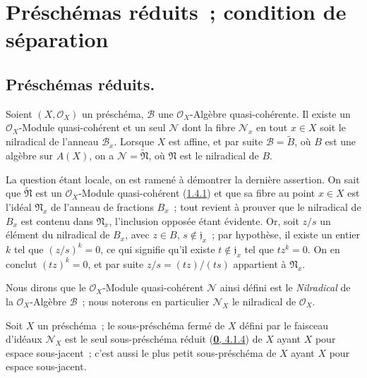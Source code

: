 \section{Préschémas réduits~; condition de séparation}
\label{section:I.5-fr}

\subsection{Préschémas réduits.}
\label{subsection:I.5.1-fr}

\begin{proposition}[5.1.1]
\label{I.5.1.1-fr}
Soient $(X,\mathscr{O}_X)$ un préschéma, $\mathscr{B}$ une
$\mathscr{O}_X$-Algèbre quasi-cohérente. Il existe un
$\mathscr{O}_X$-Module quasi-cohérent et un seul $\mathscr{N}$ dont la fibre
$\mathscr{N}_x$ en tout $x\in X$ soit le nilradical de l'anneau
$\mathscr{B}_x$. Lorsque $X$ est affine, et par suite
$\mathscr{B}=\widetilde{B}$, où $B$ est une algèbre sur $A(X)$, on a
$\mathscr{N}=\widetilde{\mathfrak{N}}$, où $\mathfrak{N}$ est le nilradical
de $B$.
\end{proposition}

La question étant locale, on est ramené à démontrer la dernière assertion. On
sait que $\widetilde{\mathfrak{N}}$ est un $\mathscr{O}_X$-Module
quasi-cohérent (\hyperref[I.1.4.1-fr]{1.4.1}) et que sa fibre au point
$x\in X$ est l'idéal $\mathfrak{N}_x$ de l'anneau de fractions $B_x$~; tout
revient à prouver que le nilradical de $B_x$ est contenu dans
$\mathfrak{N}_x$, l'inclusion opposée étant évidente. Or, soit $z/s$ un
élément du nilradical de $B_x$, avec $z\in B$, $s\notin\mathfrak{j}_x$~; par
hypothèse, il existe un entier $k$ tel que $(z/s)^k=0$, ce qui signifie qu'il
existe $t\notin\mathfrak{j}_x$ tel que $tz^k=0$. On en conclut $(tz)^k=0$, et
par suite $z/s=(tz)/(ts)$ appartient à $\mathfrak{N}_x$.

Nous dirons que le $\mathscr{O}_X$-Module quasi-cohérent $\mathscr{N}$ ainsi
défini est le \emph{Nilradical} de la $\mathscr{O}_X$-Algèbre $\mathscr{B}$~;
nous noterons en particulier $\mathscr{N}_X$ le nilradical de
$\mathscr{O}_X$.

\begin{corollary}[5.1.2]
\label{I.5.1.2-fr}
Soit $X$ un préschéma~; le sous-préschéma fermé de $X$ défini par le faisceau
d'idéaux $\mathscr{N}_X$ est le seul sous-préschéma réduit
(\hyperref[0.4.1.4-fr]{\textbf{0}, 4.1.4}) de $X$ ayant $X$ pour espace sous-jacent~;
c'est aussi le plus petit sous-préschéma de $X$ ayant $X$ pour espace
sous-jacent.
\end{corollary}

